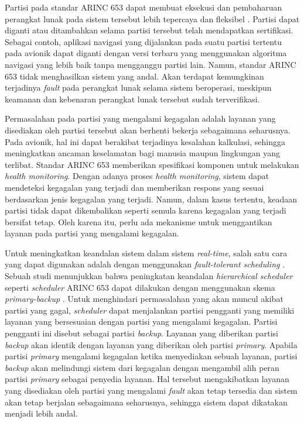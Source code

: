 Partisi pada standar ARINC 653 dapat membuat eksekusi dan pembaharuan perangkat lunak pada
sistem tersebut lebih tepercaya dan fleksibel \citep{Jin2013}.  Partisi dapat diganti atau
ditambahkan selama partisi tersebut telah mendapatkan sertifikasi. Sebagai contoh, aplikasi
navigasi yang dijalankan pada suatu partisi tertentu pada avionik dapat diganti dengan versi
terbaru yang menggunakan algoritma navigasi yang lebih baik tanpa mengganggu partisi lain.
Namun, standar ARINC 653 tidak menghasilkan sistem yang andal. Akan terdapat kemungkinan
terjadinya \textit{fault} pada perangkat lunak selama sistem beroperasi, meskipun keamanan dan
kebenaran perangkat lunak tersebut sudah terverifikasi. 

Permasalahan pada partisi yang mengalami kegagalan adalah layanan yang disediakan oleh partisi
tersebut akan berhenti bekerja sebagaimana seharusnya. Pada avionik, hal ini dapat berakibat
terjadinya kesalahan kalkulasi, sehingga meningkatkan ancaman keselamatan bagi manusia maupun
lingkungan yang terlibat. Standar ARINC 653 memberikan spesifikasi komponen untuk melakukan
\textit{health monitoring}. Dengan adanya proses \textit{health monitoring}, sistem dapat
mendeteksi kegagalan yang terjadi dan memberikan respons yang sesuai berdasarkan jenis kegagalan
yang terjadi. Namun, dalam kasus tertentu, keadaan partisi tidak dapat dikembalikan seperti
semula karena kegagalan yang terjadi bersifat tetap. Oleh karena itu, perlu ada mekanisme untuk
menggantikan layanan pada partisi yang mengalami kegagalan.

Untuk meningkatkan keandalan sistem dalam sistem \textit{real-time}, salah satu cara yang dapat
digunakan adalah dengan menggunakan \textit{fault-tolerant scheduling} \citep{Campbell1986}
\citep{Han2003} \citep{Shin2008}. Sebuah studi menunjukkan bahwa peningkatan keandalan
\textit{hierarchical scheduler} seperti \textit{scheduler} ARINC 653 dapat dilakukan dengan
menggunakan skema \textit{primary-backup} \citep{Hyun2012}. Untuk menghindari permasalahan yang
akan muncul akibat partisi yang gagal, \textit{scheduler} dapat menjalankan partisi pengganti
yang memiliki layanan yang bersesuaian dengan partisi yang mengalami kegagalan. Partisi pengganti
ini disebut sebagai partisi \textit{backup}. Layanan yang diberikan partisi \textit{backup} akan
identik dengan layanan yang diberikan oleh partisi \textit{primary}. Apabila partisi
\textit{primary} mengalami kegagalan ketika menyediakan sebuah layanan, partisi \textit{backup}
akan melindungi sistem dari kegagalan dengan mengambil alih peran partisi \textit{primary}
sebagai penyedia layanan. Hal tersebut mengakibatkan layanan yang disediakan oleh partisi yang
mengalami \textit{fault} akan tetap tersedia dan sistem akan tetap berjalan sebagaimana
seharusnya, sehingga sistem dapat dikatakan menjadi lebih andal.

